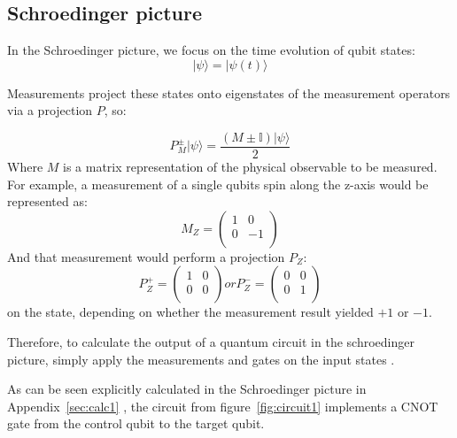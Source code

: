 \subsection{Schroedinger picture}
In the Schroedinger picture, we focus on the time evolution of qubit states:
\begin{equation}  
	|\psi\rangle = |\psi(t)\rangle 
\end{equation}

Measurements project these states onto eigenstates of the measurement operators via
a projection $P$, so:

\begin{equation}
    P_M^{\pm} |\psi\rangle = \frac{(M\pm \mathbb{I})|\psi\rangle}{2}
\end{equation}
Where $M$ is a matrix representation of the physical observable
 to be measured.
For example, a measurement of a single qubits spin along the z-axis would be
represented as:
\begin{equation}
    M_Z = \left(
        \begin{array}{cc}
            1 & 0 \\
            0 & -1 \\
        \end{array}
        \right)
\end{equation}
And that measurement would perform a projection $P_Z$:
\begin{equation}
    P_Z^+ = \left(
        \begin{array}{cc}
            1 & 0 \\
            0 & 0 \\
        \end{array}
        \right)
    or
    P_Z^- = \left(
        \begin{array}{cc}
            0 & 0 \\
            0 & 1 \\
        \end{array}
        \right)
\end{equation}
on the state, depending on whether the measurement result yielded $+1$ or $-1$.

Therefore, to calculate the output of a quantum circuit in the schroedinger
picture, simply apply the measurements and gates on the input states
.

As can be seen explicitly calculated in the Schroedinger 
picture in Appendix~\ref{sec:calc1}
, the circuit from figure~\ref{fig:circuit1}
implements a CNOT gate from the control qubit to the target qubit.

